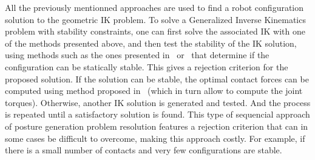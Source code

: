 All the previously mentionned approaches are used to find a robot configuration solution to the geometric IK problem.
To solve a Generalized Inverse Kinematics problem with stability constraints, one can first solve the associated IK with one of the methods presented above, and then test the stability of the IK solution, using methods such as the ones presented in~\cite{bretl:itro:2008} or~\cite{rimon2008general} that determine if the configuration can be statically stable.
This gives a rejection criterion for the proposed solution.
If the solution can be stable, the optimal contact forces can be computed using method proposed in~\cite{boyd2007fast} (which in turn allow to compute the joint torques).
Otherwise, another IK solution is generated and tested.
And the process is repeated until a satisfactory solution is found.
This type of sequencial approach of posture generation problem resolution features a rejection criterion that can in some cases be difficult to overcome, making this approach costly.
For example, if there is a small number of contacts and very few configurations are stable.

